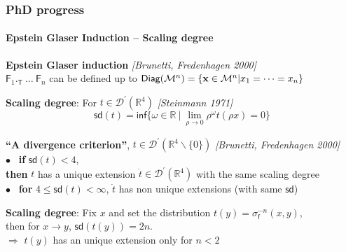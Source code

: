\documentclass[9pt]{beamer}
\renewcommand{\inf}{\mathsf{inf}} %
\newcommand{\sd}{\mathsf{sd}} %
\newcommand{\citebeam}[1]{\textit{\textcolor{black!60!white}{[#1]}}} %
\newcommand{\Dcal}{\mathcal{D}}
\newcommand{\Mcal}{\mathcal{M}}
\newcommand{\Rbb}{\mathbb{R}}
\newcommand{\Fsf}{\mathsf{F}}
\newcommand{\Tsf}{\mathsf{T}}
\newcommand{\fsf}{\mathsf{f}}
\begin{document}
\begin{frame}

\frametitle{PhD progress}
\framesubtitle{Epstein Glaser Induction -- Scaling degree}


\begin{exampleblock}{}
\vspace*{-2ex}
\textbf{Epstein Glaser induction} \citebeam{Brunetti, Fredenhagen 2000} \\
$\Fsf_1 ._\Tsf \ \dots \ \Fsf_n$ can be defined up to $\mathsf{Diag}(\Mcal^n)=\{{\bf x}\in \Mcal^n  | x_1 = \dots = x_n\}$ \\[5pt]
\vspace*{-1ex}
\end{exampleblock}

\textbf{Scaling degree}: For $t \in \Dcal^\prime(\Rbb^4)$ \citebeam{Steinmann 1971} \hfill %
\\[-15pt]
\begin{equation*}
\sd(t) = \inf \{\omega\in\Rbb \ | \ \lim_{\rho \to 0}\rho^\omega t(\rho x)=0 \} 
\end{equation*}

\vspace*{-8pt}

\begin{block}{}
\vspace*{-10pt}
\textbf{``A divergence criterion''}, $t \in \Dcal^\prime(\Rbb^4\backslash\{0\})$ \quad \citebeam{Brunetti, Fredenhagen 2000} \\
$\bullet$ \ \textbf{if} $\sd(t) < 4$, \\
\hspace*{8pt} \textbf{then} $t$ has a unique extension $\dot{t} \in \Dcal^\prime(\Rbb^4)$ with the same scaling degree \\
$\bullet$ \ \textbf{for} $4 \leq \sd(t) < \infty$, $\dot{t}$ has non unique extensions (with same $\sd$)
\end{block}

\textbf{Scaling degree}:
Fix $x$ and set the distribution $t(y) = \sigma_\fsf^{-n}(x,y)$, \\
then for $x \to y$, $\sd(t(y)) = 2n$. \\
$\Rightarrow$ $t(y)$ has an unique extension only for $n < 2$

\end{frame} 

\end{document}
